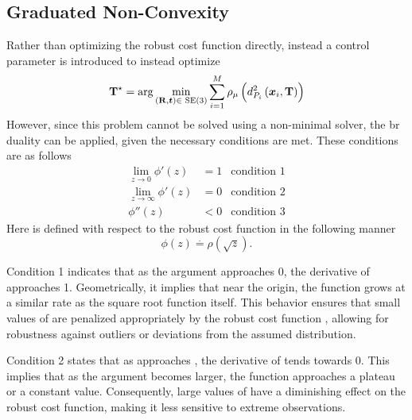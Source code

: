 


\subsection{Graduated Non-Convexity}\label{subs:2-pose-estimation-graduated-non-convexity}

Rather than optimizing the robust cost function \mvar{\rho(\cdot)} directly, instead a control parameter \mvar{\mu} is introduced to instead optimize
%
\begin{equation}
	\tf[T]{\star}{}=\arg \min_{(\mat{R},\vec{t})\in\SE (3)} \sum^M_{i=1} \rho_\mu \left(d_{P_i}^2\left(\vec{x}_i, \mat{T} \right)\right)
\end{equation}
However, since this problem cannot be solved using a non-minimal solver, the \gls{br} duality can be applied, given the necessary conditions are met. These conditions are as follows
%
\begin{align}\label{eq:br-condition-1-2-3}
	\lim_{z\rightarrow 0} \phi'(z) &= 1 & \text{condition 1} \\
	\lim_{z\rightarrow \infty}\phi'(z) &= 0 & \text{condition 2} \\
	\phi''(z) &< 0 & \text{condition 3}
\end{align}
Here  is defined with respect to the robust cost function \mvar{\rho} in the following manner
%
\begin{equation}
	\phi(z) \overset{\cdot}{=} \rho(\sqrt{z}).
\end{equation}

Condition 1 indicates that as the argument  approaches \num{0}, the derivative of  approaches \num{1}. Geometrically, it implies that near the origin, the function  grows at a similar rate as the square root function itself. This behavior ensures that small values of  are penalized appropriately by the robust cost function \mvar{\rho(\cdot)}, allowing for robustness against outliers or deviations from the assumed distribution. \medskip

Condition 2 states that as  approaches \mvar{\infty}, the derivative of  tends towards \num{0}. This implies that as the argument becomes larger, the function  approaches a plateau or a constant value. Consequently, large values of  have a diminishing effect on the robust cost function, making it less sensitive to extreme observations. \medskip


